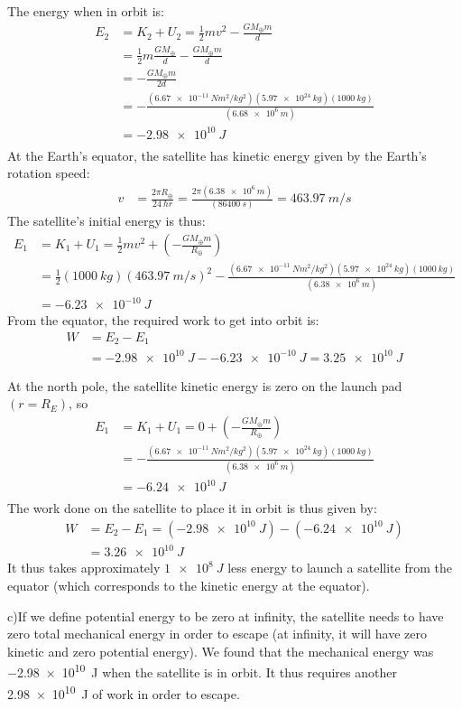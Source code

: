 \begin{solution}
\begin{parts}
The energy when in orbit is:
\begin{align*}
E_2 &= K_2+U_2= \frac{1}{2}mv^2 -\frac{GM_\oplus m}{d}\\
&=\frac{1}{2}m \frac{GM_\oplus }{d} -\frac{G M_\oplus m}{d}\\
&=-\frac{GM_\oplus m}{2d}\\
&= -\frac{(\SI{6.67e-11}{N m^2/kg^2})(\SI{5.97e24}{kg})(\SI{1000}{kg})}{(\SI{6.68e6}{m})}\\
&= \SI{-2.98e10}{J}\\
\end{align*}
At the Earth's equator, the satellite has kinetic energy given by the Earth's rotation speed:
\begin{align*}
v &= \frac{2\pi R_\oplus}{\SI{24}{hr}}=\frac{2\pi (\SI{6.38e6}{m})}{(\SI{86400}{s})}=\SI{463.97}{m/s}
\end{align*}
The satellite's initial energy is thus:
\begin{align*}
E_1&= K_1+U_1=\frac{1}{2}mv^2+\left(-\frac{GM_\oplus m}{R_\oplus}\right)\\
&=\frac{1}{2}(\SI{1000}{kg})(\SI{463.97}{m/s})^2-\frac{(\SI{6.67e-11}{N m^2/kg^2})(\SI{5.97e24}{kg})(\SI{1000}{kg})}{(\SI{6.38e6}{m})}\\
&=\SI{-6.23e-10}{J}
\end{align*}
From the equator, the required work to get into orbit is:
\begin{align*}
W &= E_2 - E_1\\
&=\SI{-2.98e10}{J} - \SI{-6.23e-10}{J}=\SI{3.25e10}{J}
\end{align*}

At the north pole, the satellite kinetic energy is zero on the launch pad $(r=R_E)$, so
\begin{align*}
E_1&= K_1+U_1=0+\left(-\frac{GM_\oplus m}{R_\oplus}\right)\\
&= -\frac{(\SI{6.67e-11}{N m^2/kg^2})(\SI{5.97e24}{kg})(\SI{1000}{kg})}{(\SI{6.38e6}{m})}\\
&= \SI{-6.24e10}{J}\\
\end{align*}
The work done on the satellite to place it in orbit is thus given by:\\
\begin{align*}
W &= E_2-E_1=(\SI{-2.98e10}{J})-(\SI{-6.24e10}{J})\\
&= \SI{3.26e10}{J}
\end{align*}
It thus takes approximately $\SI{1e8}{J}$ less energy to launch a satellite from the equator (which corresponds to the kinetic energy at the equator). 

c)If we define potential energy to be zero at infinity, the satellite needs to have zero total mechanical energy in order to escape (at infinity, it will have zero kinetic and zero potential energy). We found that the mechanical energy was \SI{-2.98e10}{J} when the satellite is in orbit. It thus requires another \SI{2.98e10}{J} of work in order to escape.
\end{parts}
\end{solution}

